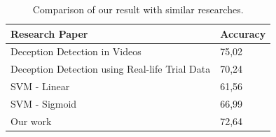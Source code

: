 \begin{table}[H]
	\centering
	\begin{tabular}{|l|l|}
		\hline
		\textbf{Research Paper}  & \textbf{Accuracy} \\ \hline
		Deception Detection in Videos \cite{DBLP:journals/corr/abs-1712-04415} & 75,02             \\ \hline
		Deception Detection using Real-life Trial Data \cite{Perez-Rosas:2015:DDU:2818346.2820758}       & 70,24             \\ \hline
		SVM - Linear        & 61,56             \\ \hline
		SVM - Sigmoid        & 66,99             \\ \hline
		Our work       & 72,64             \\ \hline
	\end{tabular}
	\caption{Comparison of our result with similar researches.}
\end{table}